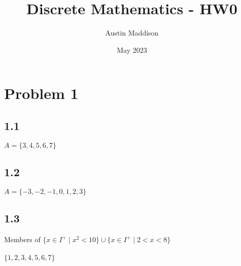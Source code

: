 \documentclass{article}
\title{Discrete Mathematics - HW0}
\author{Austin Maddison}
\date{May 2023}
\begin{document}
\maketitle

\section*{Problem 1}
\begin{multicols}{2}
\subsection*{1.1}
$A = \{3,4,5,6,7\}$ 
\subsection*{1.2}
$A = \{-3,-2,-1,0,1,2,3\}$ 
\subsection*{1.3}
Members of $\{x\in I^{+} \mid x^{2} < 10 \} \cup \{x \in I^{+} \mid 2 < x < 8 \}$
\\\\
$\{1, 2, 3, 4, 5, 6, 7\}$ 
\end{multicols}
\end{document}
